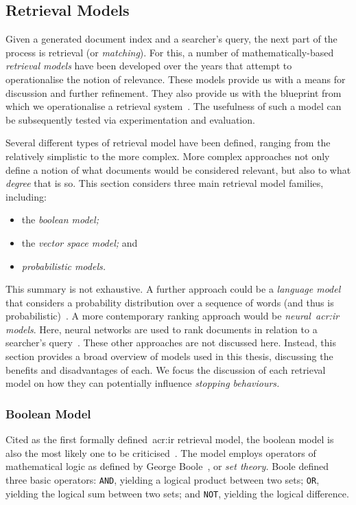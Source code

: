 \subsection{Retrieval Models}\label{sec:ir_background:basics:models}
Given a generated document index and a searcher's query, the next part of the process is retrieval (or \emph{matching}). For this, a number of mathematically-based \emph{retrieval models} have been developed over the years that attempt to operationalise the notion of relevance. These models provide us with a means for discussion and further refinement. They also provide us with the blueprint from which we operationalise a retrieval system~\citep{hiemstra2009ir_models}. The usefulness of such a model can be subsequently tested via experimentation and evaluation.

Several different types of retrieval model have been defined, ranging from the relatively simplistic to the more complex. More complex approaches not only define a notion of what documents would be considered relevant, but also to what \emph{degree} that is so. This section considers three main retrieval model families, including:

\begin{itemize}
    \item{the \emph{boolean model;}}
    \item{the \emph{vector space model;} and}
    \item{\emph{probabilistic models.}}
\end{itemize}

This summary is not exhaustive. A further approach could be a \emph{language model} that considers a probability distribution over a sequence of words (and thus is probabilistic)~\citep{manning2008ir}. A more contemporary ranking approach would be \emph{neural~\gls{acr:ir} models}. Here, neural networks are used to rank documents in relation to a searcher's query~\citep{mitra2017neural_ir}. These other approaches are not discussed here. Instead, this section provides a broad overview of models used in this thesis, discussing the benefits and disadvantages of each. We focus the discussion of each retrieval model on how they can potentially influence \emph{stopping behaviours.}

\subsubsection{Boolean Model}
Cited as the first formally defined~\gls{acr:ir} retrieval model, the boolean model is also the most likely one to be criticised~\citep{hiemstra2009ir_models}. The model employs operators of mathematical logic as defined by George Boole~\citep{boole1847mathematical}, or \emph{set theory.} Boole defined three basic operators: \texttt{AND}, yielding a logical product between two sets; \texttt{OR}, yielding the logical sum between two sets; and \texttt{NOT}, yielding the logical difference.

